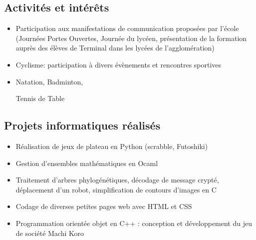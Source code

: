 \documentclass[9pt, oneside, a4paper, titlepage]{extarticle}
\begin{document}
\begin{tcolorbox}
\begin{minipage}[t]{6.2cm}
\begin{spacing}{0.95}
\begin{tcolorbox}[grow to left by = 0.6cm, colback = gray!25, colframe = white]
                \vspace*{0.2cm}
                \section*{Activités et intérêts}

                \begin{itemize}
                    \vspace*{0.2cm}
                    \item Participation aux manifestations de communication proposées par l’école (Journées Portes Ouvertes, Journée du lycéen, présentation de la formation auprès des élèves de Terminal dans les lycées de l’agglomération)
                    \vspace*{0.1cm}
                    \item Cyclisme: participation à divers évènements et rencontres sportives
                    \item Natation, Badminton, 
                    
                    Tennis de Table
                    
                \end{itemize}

            \end{tcolorbox}
        \end{spacing}
        \end{minipage}
        \hspace*{0.4mm}
        \begin{minipage}[t]{12.8cm}
            \vspace*{-0.5cm}
            \begin{tcolorbox}[grow to right by = 0.6cm, colback = gray!25, colframe = white]
                \section*{Projets informatiques réalisés}
                \begin{itemize}
                    \item Réalisation de jeux de plateau en Python (scrabble, Futoshiki)
                    \item Gestion d’ensembles mathématiques en Ocaml
                    \item Traitement d’arbres phylogénétiques, décodage de message crypté, déplacement d’un robot, simplification de contours d’images en C
                    \item Codage de diverses petites pages web avec HTML et CSS
                    \item Programmation orientée objet en C++ : conception et développement du jeu de société Machi Koro


\end{itemize}
\end{tcolorbox}
\end{minipage}
\end{tcolorbox}
\end{document}
